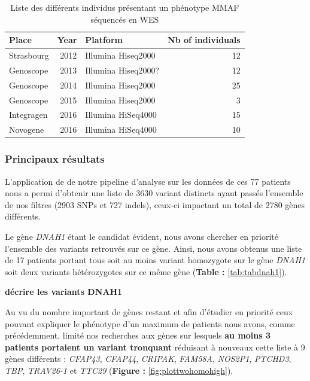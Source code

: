 \documentclass[12pt,twoside]{reedthesis}
\theoremstyle{definition}
\theoremstyle{definition}
\theoremstyle{remark}
\begin{document}
  \begin{longtable}[t]{lrlr}
  \caption{\label{tab:tabrunbigmmaf}Liste des différents individus présentant un phénotype MMAF séquencés en WES}\\
  \toprule
  Place & Year & Platform & Nb of individuals\\
  \midrule
  Strasbourg & 2012 & Illumina Hiseq2000 & 12\\
  Genoscope & 2013 & Illumina Hiseq2000? & 12\\
  Genoscope & 2014 & Illumina Hiseq2000 & 25\\
  Genoscope & 2015 & Illumina Hiseq2000 & 3\\
  Integragen & 2016 & Illumina HiSeq4000 & 15\\
  Novogene & 2016 & Illumina HiSeq4000 & 10\\
  \bottomrule
  \end{longtable}
  
  
  
  \newpage
  
  \subsubsection{Principaux résultats}\label{principaux-resultats-6}
  
  L'application de de notre pipeline d'analyse sur les données de ces 77
  patients nous a permi d'obtenir une liste de 3630 variant distincts
  ayant passés l'ensemble de nos filtres (2903 SNPs et 727 indels),
  ceux-ci impactant un total de 2780 gènes différents.
  
  Le gène \emph{DNAH1} étant le candidat évident, nous avons chercher en
  priorité l'ensemble des variants retrouvés sur ce gène. Ainsi, nous
  avons obtenus une liste de 17 patients portant tous soit au moins
  variant homozygote sur le gène \emph{DNAH1} soit deux variants
  hétérozygotes sur ce même gène (\textbf{Table : }\ref{tab:tabdnah1}).
  
  \textbf{décrire les variants DNAH1}
  
  Au vu du nombre important de gènes restant et afin d'étudier en priorité
  ceux pouvant expliquer le phénotype d'un maximum de patients nous avons,
  comme précédemment, limité nos recherches aux gènes sur lesquels
  \textbf{au moins 3 patients portaient un variant tronquant} réduisant à
  nouveaux cette liste à 9 gènes différents : \emph{CFAP43},
  \emph{CFAP44}, \emph{CRIPAK}, \emph{FAM58A}, \emph{NOS2P1},
  \emph{PTCHD3}, \emph{TBP}, \emph{TRAV26-1} et \emph{TTC29}
  (\textbf{Figure : }\ref{fig:plottwohomohigh}).
  
\end{document}
